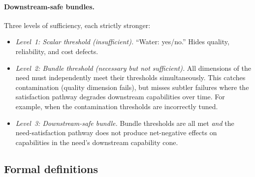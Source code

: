 \paragraph{Downstream-safe bundles.}
Three levels of sufficiency, each strictly stronger:
\begin{itemize}
\item \emph{Level~1: Scalar threshold (insufficient).}
  ``Water: yes/no.''  Hides quality, reliability, and cost defects.
\item \emph{Level~2: Bundle threshold (necessary but not
  sufficient).}
  All dimensions of the need must independently meet their thresholds
        simultaneously. This catches contamination (quality dimension fails),
        but misses subtler failures where the satisfaction pathway degrades
        downstream capabilities over time. For example, when the contamination
        thresholds are incorrectly tuned.
\item \emph{Level~3: Downstream-safe bundle.}
  Bundle thresholds are all met \emph{and} the need-satisfaction pathway does
        not produce net-negative effects on capabilities in the need's
        downstream capability cone.
\end{itemize}

\subsection{Formal definitions}

